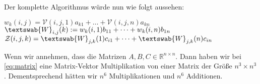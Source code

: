 Der komplette Algorithmus würde nun wie folgt aussehen:
\begin{algorithmic}
			\State $w_{k}(i,j) = \mathcal{V}(i,j,1)a_{k1} + \dots + \mathcal{V}(i,j,n)a_{kn}$
		\EndFor
	\EndFor
\EndFor
{}
			\State $\textswab{W}_{i,j} (k):= w_k(i,1) b_{11} + \dots + w_k(i,n) b_{1n}$
		\EndFor
	\EndFor
\EndFor
{}
			\State $\mathcal{Z}(i,j,k) = \textswab{W}_{j,k}(1) c_{i1}  + \dots +  \textswab{W}_{j,k}(n) c_{in}$ 
		\EndFor
	\EndFor
\EndFor
\end{algorithmic}

 
Wenn wir annehmen, dass die Matrizen $A,B,C \in \mathbb{R}^{n \times n}$. Dann haben wir bei \ref{eq:matrix} eine Matrix-Vektor Multiplikation von einer Matrix der Größe $n^{3} \times n^{3}$. Dementsprechend hätten wir $n^{6}$ Multiplikationen und $n^{6}$ Additionen.





